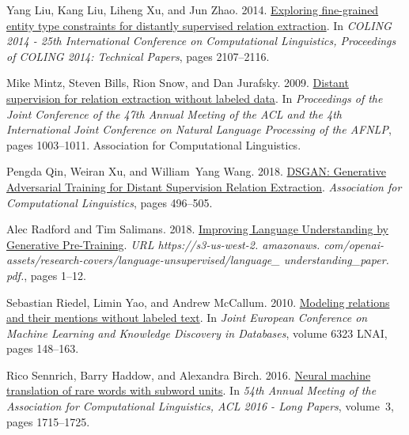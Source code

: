 \documentclass[11pt,a4paper]{article}
\begin{document}
\begin{thebibliography}{30}
Yang Liu, Kang Liu, Liheng Xu, and Jun Zhao. 2014.
\newblock \href {http://www.freebase.com/} {{Exploring fine-grained entity type
  constraints for distantly supervised relation extraction}}.
\newblock In \emph{COLING 2014 - 25th International Conference on Computational
  Linguistics, Proceedings of COLING 2014: Technical Papers}, pages 2107--2116.

Mike Mintz, Steven Bills, Rion Snow, and Dan Jurafsky. 2009.
\newblock \href {https://www.aclweb.org/anthology/P09-1113} {{Distant
  supervision for relation extraction without labeled data}}.
\newblock In \emph{Proceedings of the Joint Conference of the 47th Annual
  Meeting of the ACL and the 4th International Joint Conference on Natural
  Language Processing of the AFNLP}, pages 1003--1011. Association for
  Computational Linguistics.

Pengda Qin, Weiran Xu, and William~Yang Wang. 2018.
\newblock \href {http://aclweb.org/anthology/P18-1046
  http://arxiv.org/abs/1805.09929} {{DSGAN: Generative Adversarial Training for
  Distant Supervision Relation Extraction}}.
\newblock \emph{Association for Computational Linguistics}, pages 496--505.

Alec Radford and Tim Salimans. 2018.
\newblock \href {https://gluebenchmark.com/leaderboard
  https://s3-us-west-2.amazonaws.com/openai-assets/research-covers/language-unsupervised/language_understanding_paper.pdf}
  {{Improving Language Understanding by Generative Pre-Training}}.
\newblock \emph{URL https://s3-us-west-2. amazonaws.
  com/openai-assets/research-covers/language-unsupervised/language{\_}
  understanding{\_}paper. pdf.}, pages 1--12.

Sebastian Riedel, Limin Yao, and Andrew McCallum. 2010.
\newblock \href {https://doi.org/10.1007/978-3-642-15939-8{\_}10} {{Modeling
  relations and their mentions without labeled text}}.
\newblock In \emph{Joint European Conference on Machine Learning and Knowledge
  Discovery in Databases}, volume 6323 LNAI, pages 148--163.

Rico Sennrich, Barry Haddow, and Alexandra Birch. 2016.
\newblock \href {https://doi.org/10.18653/v1/p16-1162} {{Neural machine
  translation of rare words with subword units}}.
\newblock In \emph{54th Annual Meeting of the Association for Computational
  Linguistics, ACL 2016 - Long Papers}, volume~3, pages 1715--1725.


\end{thebibliography}
\end{document}
